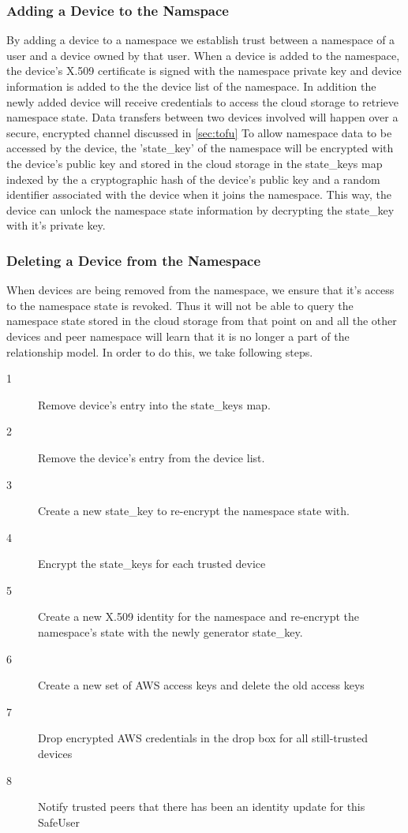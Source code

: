 \subsubsection{Adding a Device to the Namspace}
By adding a device to a namespace we establish trust between a namespace of a user and a device owned by that user. When a device is added to the namespace, the device's X.509 certificate is signed with the namespace private key and device information is added to the the device list of the namespace. In addition the newly added device will receive credentials to access the cloud storage to retrieve namespace state. Data transfers between two devices involved will happen over a secure, encrypted channel discussed in \ref{sec:tofu} To allow namespace data to be accessed by the device, the 'state\_key' of the namespace will be encrypted with the device's public key and stored in the cloud storage in the state\_keys map indexed by the a cryptographic hash of the device's public key and a random identifier associated with the device when it joins the namespace. This way, the device can unlock the namespace state information by decrypting the state\_key with it's private key. 

\subsubsection{Deleting a Device from the Namespace}
When devices are being removed from the namespace, we ensure that it's access to the namespace state is revoked. Thus it will not be able to query the namespace state stored in the cloud storage from that point on and all the other devices and peer namespace will learn that it is no longer a part of the relationship model. In order to do this, we take following steps.

\begin{description} 
\item[1] Remove device's entry into the state\_keys map.
\item[2] Remove the device's entry from the device list.
\item[3] Create a new state\_key to re-encrypt the namespace state with.
\item[4] Encrypt the state\_keys for each trusted device
\item[5] Create a new X.509 identity for the namespace and re-encrypt the namespace's state with the newly generator state\_key.
\item[6] Create a new set of AWS access keys and delete the old access keys
\item[7] Drop encrypted AWS credentials in the drop box for all still-trusted devices
\item[8] Notify trusted peers that there has been an identity update for this SafeUser
\end{description}

